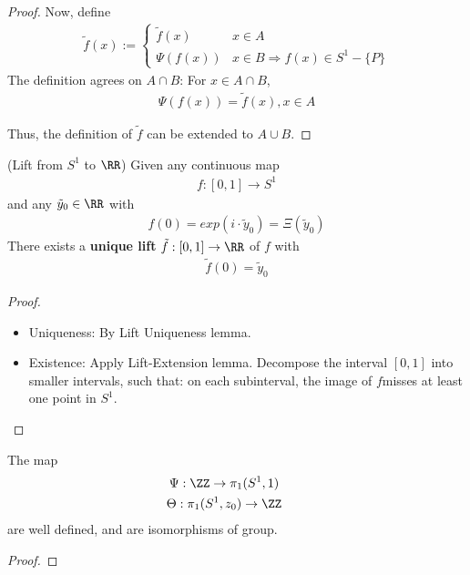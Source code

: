 \documentclass[Total.tex]{subfiles}
\begin{document}
\begin{itemize}
\begin{proof}
			Now, define
			\begin{gather*}
				\tilde{f}(x):=\begin{cases}
					\tilde{f}(x)&x\in A\\
					\Psi(f(x))&x\in B\Rightarrow f(x)\in S^1-\{P\}
				\end{cases}
			\end{gather*}
			The definition agrees on $A\cap B$: For $x\in A\cap B$,
			\begin{gather*}
				\Psi(f(x))=\tilde{f}(x),x\in A
			\end{gather*}
			
			Thus, the definition of $\tilde{f}$ can be extended to $A\cup B$. 
		\end{proof}
		
		\begin{lemma}
			(Lift from $S^1$ to $\RR$) Given any continuous map 
			\begin{gather*}
				f:[0,1]\rightarrow S^1
			\end{gather*}
			and any $\tilde{y}_0\in \RR$ with
			\begin{gather*}
				f(0)=exp(i\cdot \tilde{y}_0)=\Xi(\tilde{y}_0)
			\end{gather*}
			There exists a \textbf{unique lift} $\tilde{f}:[0,1]\rightarrow \RR$ of $f$ with
			\begin{gather*}
				\tilde{f}(0)=\tilde{y}_0
			\end{gather*} 
		\end{lemma}
		\begin{proof}
			\begin{itemize}
				\item Uniqueness: By Lift Uniqueness lemma.
				\item Existence: Apply Lift-Extension lemma. Decompose the interval $[0,1]$ into smaller intervals, such that: on each subinterval, the image of $f$misses at least one point in $S^1$.
			\end{itemize}
		\end{proof}
		\begin{theorem}
			The map
			\begin{gather*}
				\Psi:\ZZ\rightarrow \pi_1(S^1,1)\qquad \\
				\Theta:\pi_1(S^1,z_0)\rightarrow \ZZ\qquad 
			\end{gather*}
			are well defined, and are isomorphisms of group.
		\end{theorem}
		\begin{proof}
			

\end{proof}
\end{itemize}
\end{document}

